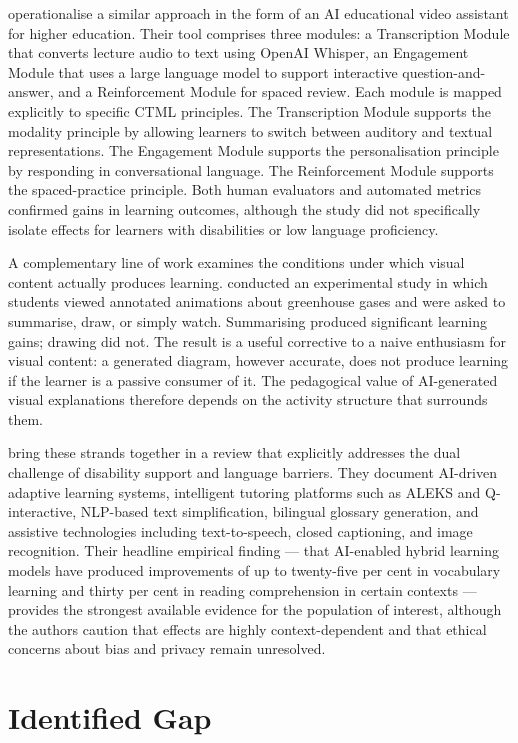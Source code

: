 \citet{osman2024} operationalise a similar approach in the form of an AI educational video assistant for higher education. Their tool comprises three modules: a Transcription Module that converts lecture audio to text using OpenAI Whisper, an Engagement Module that uses a large language model to support interactive question-and-answer, and a Reinforcement Module for spaced review. Each module is mapped explicitly to specific CTML principles. The Transcription Module supports the modality principle by allowing learners to switch between auditory and textual representations. The Engagement Module supports the personalisation principle by responding in conversational language. The Reinforcement Module supports the spaced-practice principle. Both human evaluators and automated metrics confirmed gains in learning outcomes, although the study did not specifically isolate effects for learners with disabilities or low language proficiency.

A complementary line of work examines the conditions under which visual content actually produces learning. \citet{lawson2024} conducted an experimental study in which students viewed annotated animations about greenhouse gases and were asked to summarise, draw, or simply watch. Summarising produced significant learning gains; drawing did not. The result is a useful corrective to a naive enthusiasm for visual content: a generated diagram, however accurate, does not produce learning if the learner is a passive consumer of it. The pedagogical value of AI-generated visual explanations therefore depends on the activity structure that surrounds them.

\citet{ahmad2025} bring these strands together in a review that explicitly addresses the dual challenge of disability support and language barriers. They document AI-driven adaptive learning systems, intelligent tutoring platforms such as ALEKS and Q-interactive, NLP-based text simplification, bilingual glossary generation, and assistive technologies including text-to-speech, closed captioning, and image recognition. Their headline empirical finding --- that AI-enabled hybrid learning models have produced improvements of up to twenty-five per cent in vocabulary learning and thirty per cent in reading comprehension in certain contexts --- provides the strongest available evidence for the population of interest, although the authors caution that effects are highly context-dependent and that ethical concerns about bias and privacy remain unresolved.

\section{Identified Gap}

